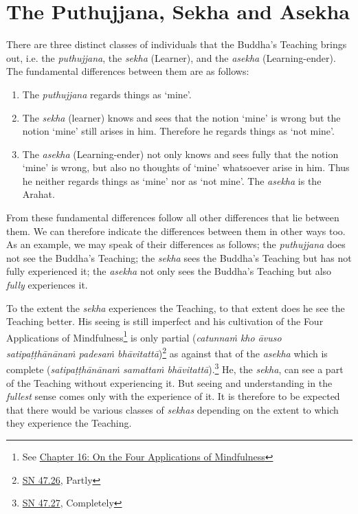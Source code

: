 \chapter{The Puthujjana, Sekha and Asekha}

There are three distinct classes of individuals that the Buddha's Teaching brings out, i.e. the \textit{puthujjana}, the \textit{sekha} (Learner), and the \textit{asekha} (Learning-ender). The fundamental differences between them are as follows:

\begin{enumerate}
\def\labelenumi{\arabic{enumi}.}
\item
  The \textit{puthujjana} regards things as `mine'.
\item
  The \textit{sekha} (learner) knows and sees that the notion `mine' is wrong but the notion `mine' still arises in him. Therefore he regards things as `not mine'.
\item
  The \textit{asekha} (Learning-ender) not only knows and sees fully that the notion `mine' is wrong, but also no thoughts of `mine' whatsoever arise in him. Thus he neither regards things as `mine' nor as `not mine'. The \textit{asekha} is the Arahat.
\end{enumerate}

From these fundamental differences follow all other differences that lie between them. We can therefore indicate the differences between them in other ways too. As an example, we may speak of their differences as follows; the \textit{puthujjana} does not see the Buddha's Teaching; the \textit{sekha} sees the Buddha's Teaching but has not fully experienced it; the \textit{asekha} not only sees the Buddha's Teaching but also \emph{fully} experiences it.

To the extent the \textit{sekha} experiences the Teaching, to that extent does he see the Teaching better. His seeing is still imperfect and his cultivation of the Four Applications of Mindfulness\footnote{See \href{ch-16-satipatthana.xml\#start}{Chapter 16: On the Four Applications of Mindfulness}} is only partial (\textit{catunnaṁ kho āvuso satipaṭṭhānānaṁ padesaṁ bhāvitattā})\footnote{\href{https://suttacentral.net/sn47.26/en/bodhi}{SN 47.26}, Partly} as against that of the \textit{asekha} which is complete (\textit{satipaṭṭhānānaṁ samattaṁ bhāvitattā}).\footnote{\href{https://suttacentral.net/sn47.27/en/bodhi}{SN 47.27}, Completely} He, the \textit{sekha}, can see a part of the Teaching without experiencing it. But seeing and understanding in the \emph{fullest} sense comes only with the experience of it. It is therefore to be expected that there would be various classes of \textit{sekhas} depending on the extent to which they experience the Teaching.

